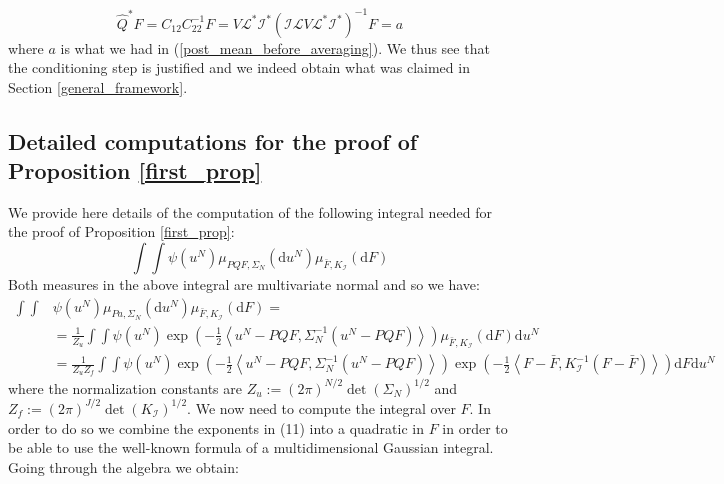 \begin{equation}
    \hat{Q}^{*}F=C_{12}C_{22}^{-1}F=V\mathcal{L}^{*}\mathcal{I}^{*}(\mathcal{I}\mathcal{L}V\mathcal{L}^{*}\mathcal{I}^{*})^{-1}F=a
\end{equation}
where $a$ is what we had in (\ref{post_mean_before_averaging}). We thus see that the conditioning step is justified and we indeed obtain what was claimed in Section \textcolor{blue}{\ref{general_framework}}. \qedsymbol

\subsection{Detailed computations for the proof of Proposition \textcolor{blue}{\ref{first_prop}}}

We provide here details of the computation of the following integral needed for the proof of Proposition \textcolor{blue}{\ref{first_prop}}:
\begin{equation*}
    \int\int\psi(u^{N})\mu_{PQF,\Sigma_N}(\mathrm{d}u^{N})\mu_{\bar{F},K_{\mathcal{I}}}(\mathrm{d}F)
\end{equation*}
Both measures in the above integral are multivariate normal and so we have:
\begin{align}
    \int\int&\psi(u^{N})\mu_{Pa,\Sigma_N}(\mathrm{d}u^{N})\mu_{\bar{F},K_{\mathcal{I}}}(\mathrm{d}F)= \nonumber \\ &=\frac{1}{Z_u}\int\int\psi(u^{N})\exp\left(-\frac{1}{2}\left\langle u^{N}-PQF,\Sigma_{N}^{-1}(u^{N}-PQF) \right\rangle\right)\mu_{\bar{F},K_{\mathcal{I}}}(\mathrm{d}F)\mathrm{d}u^{N} \nonumber \\
    &=\frac{1}{Z_{u}Z_{f}}\int\int\psi(u^{N})\exp\left(-\frac{1}{2}\left\langle u^{N}-PQF,\Sigma_{N}^{-1}(u^{N}-PQF)\right\rangle\right)\exp\left(-\frac{1}{2}\left\langle F-\bar{F},K_{\mathcal{I}}^{-1}(F-\bar{F}) \right\rangle\right)\mathrm{d}F\mathrm{d}u^{N}
\end{align}
where the normalization constants are $Z_u:=(2\pi)^{N/2}\det(\Sigma_N)^{1/2}$ and $Z_f:=(2\pi)^{J/2}\det(K_\mathcal{I})^{1/2}$. We now need to compute the integral over $F$. In order to do so we combine the exponents in (11) into a quadratic in $F$ in order to be able to use the well-known formula of a multidimensional Gaussian integral. Going through the algebra we obtain:

